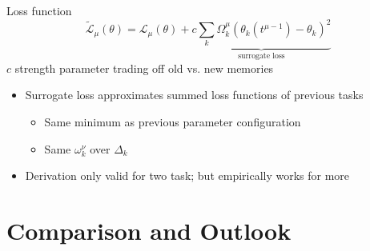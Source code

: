 \documentclass{beamer}
\begin{document}
\begin{frame}{Loss function}
\begin{equation}
\tilde{\mathcal L}_\mu(\theta) = \mathcal L_\mu(\theta) + \underbrace{c \sum_k \Omega_k^\mu \left( \theta_k(t^{\mu-1}) - \theta_k\right)^2}_{\text{surrogate loss}}
\end{equation}
$c$ strength parameter trading off old vs. new memories
\begin{itemize}
	\item<2-> Surrogate loss approximates summed loss functions of previous tasks 
	\begin{itemize}
		\item<2-> Same minimum as previous parameter configuration
		\item<2-> Same $\omega_k^\nu$ over $\Delta_k$
	\end{itemize}
	\item<3-> Derivation only valid for two task; but empirically works for more
\end{itemize}
\end{frame}

\section{Comparison and Outlook}
\end{document}
